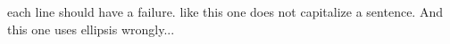 each line should have a failure.  like this one does not capitalize a sentence.
And this one uses ellipsis wrongly...

